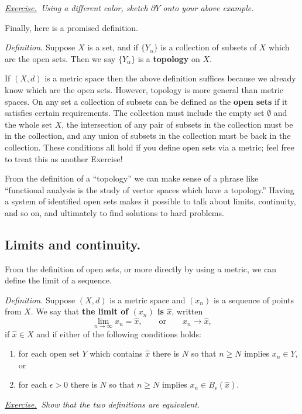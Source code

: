 \documentclass[12pt]{article}
\newcommand{\eps}{\epsilon}
\newcommand{\sect}[1]{\subsection*{#1.}}
\newcommand{\defin}{\emph{Definition.}\,\,}
\newcommand{\exer}[2]{\emph{\underline{Exercise.}\, #2} \vspace*{#1mm}}
\begin{document}
\exer{1}{Using a different color, sketch $\partial Y$ onto your above example.}

Finally, here is a promised definition.

\defin Suppose $X$ is a set, and if $\{Y_\alpha\}$ is a collection of subsets of $X$ which are the open sets.  Then we say $\{Y_\alpha\}$ is a \textbf{topology} on $X$.

If $(X,d)$ is a metric space then the above definition suffices because we already know which are the open sets.  However, topology is more general than metric spaces.  On any set a collection of subsets can be defined as the \textbf{open sets} if it satisfies certain requirements.  The collection must include the empty set $\emptyset$ and the whole set $X$, the intersection of any pair of subsets in the collection must be in the collection, and any union of subsets in the collection must be back in the collection.  These conditions all hold if you define open sets via a metric; feel free to treat this as another Exercise!

From the definition of a ``topology'' we can make sense of a phrase like ``functional analysis is the study of vector spaces which have a topology.''  Having a system of identified open sets makes it possible to talk about limits, continuity, and so on, and ultimately to find solutions to hard problems.


\sect{Limits and continuity}

From the definition of open sets, or more directly by using a metric, we can define the limit of a sequence.

\defin Suppose $(X,d)$ is a metric space and $(x_n)$ is a sequence of points from $X$.  We say that \textbf{the limit of $(x_n)$ is $\hat x$}, written
	$$\lim_{n\to\infty} x_n = \hat x, \qquad \text{or} \qquad x_n \to \hat x,$$
if $\hat x \in X$ and if either of the following conditions holds:
\begin{enumerate}
\item for each open set $Y$ which contains $\hat x$ there is $N$ so that $n\ge N$ implies $x_n \in Y$, or
\item for each $\eps>0$ there is $N$ so that $n\ge N$ implies $x_n \in B_\eps(\hat x)$.
\end{enumerate}

\exer{20}{Show that the two definitions are equivalent.}

\clearpage\newpage
\phantom{foo}
\vspace{20mm}
\end{document}
